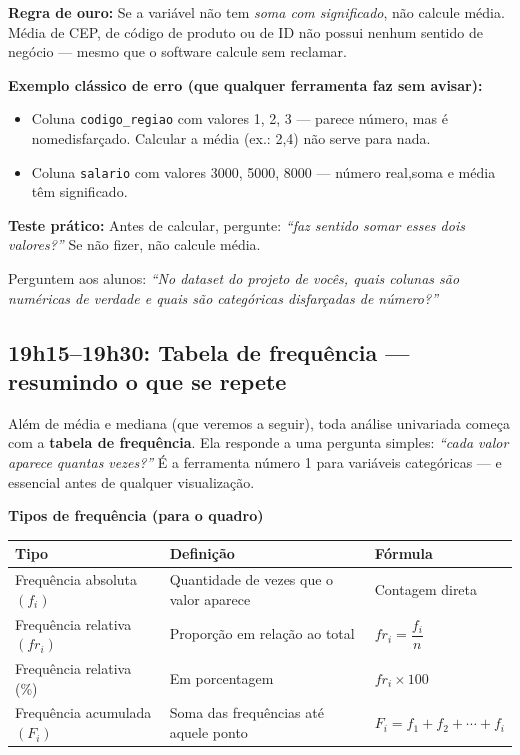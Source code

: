 \begin{SolvedBox}
\textbf{Regra de ouro:} Se a variável não tem \emph{soma com significado},
não calcule média. Média de CEP, de código de produto ou de ID não possui
nenhum sentido de negócio — mesmo que o software calcule sem reclamar.

\textbf{Exemplo clássico de erro (que qualquer ferramenta faz sem avisar):}
\begin{itemize}
  \item Coluna \texttt{codigo\_regiao} com valores 1, 2, 3 — parece número, mas é nome\break disfarçado. Calcular a média (ex.: 2,4) não serve para nada.
  \item Coluna \texttt{salario} com valores 3000, 5000, 8000 — número real,\break soma e média têm significado.
\end{itemize}

\textbf{Teste prático:} Antes de calcular, pergunte: \emph{``faz sentido somar esses dois valores?''} Se não fizer, não calcule média.
\end{SolvedBox}

Perguntem aos alunos: \textit{``No dataset do projeto de vocês, quais colunas
são numéricas de verdade e quais são categóricas disfarçadas de número?''}

\subsection{19h15–19h30: Tabela de frequência — resumindo o que se repete}

Além de média e mediana (que veremos a seguir), toda análise univariada começa
com a \textbf{tabela de frequência}. Ela responde a uma pergunta simples:
\emph{``cada valor aparece quantas vezes?''} É a ferramenta número 1 para
variáveis categóricas — e essencial antes de qualquer visualização.

\begin{BoardBox}
\textbf{Tipos de frequência (para o quadro)}
\begin{tabular}{|l|p{5.5cm}|p{5.5cm}|}
\hline
\textbf{Tipo} & \textbf{Definição} & \textbf{Fórmula} \\
\hline
Frequência absoluta $(f_i)$ & Quantidade de vezes que o valor aparece & Contagem direta \\
\hline
Frequência relativa $(fr_i)$ & Proporção em relação ao total & $fr_i = \dfrac{f_i}{n}$ \\
\hline
Frequência relativa (\%) & Em porcentagem & $fr_i \times 100$ \\
\hline
Frequência acumulada $(F_i)$ & Soma das frequências até aquele ponto & $F_i = f_1 + f_2 + \cdots + f_i$ \\
\hline
\end{tabular}
\end{BoardBox}

